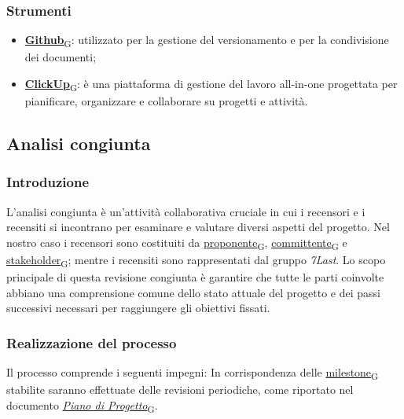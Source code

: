 \subsubsection{Strumenti}

\begin{itemize}
	\item \href{https://7last.github.io/docs/rtb/documentazione-interna/glossario\#github}{\textbf{Github}\textsubscript{G}}: utilizzato per la gestione del versionamento e per la condivisione dei documenti;
	\item \href{https://7last.github.io/docs/rtb/documentazione-interna/glossario\#clickup}{\textbf{ClickUp}\textsubscript{G}}: è una piattaforma di gestione del lavoro all-in-one progettata per pianificare, organizzare e collaborare su progetti e attività.
\end{itemize}


\subsection{Analisi congiunta}
\subsubsection{Introduzione}
L'analisi congiunta è un'attività collaborativa cruciale in cui i recensori e i recensiti si incontrano per esaminare e valutare diversi aspetti del progetto.  Nel nostro caso i recensori sono costituiti da \href{https://7last.github.io/docs/rtb/documentazione-interna/glossario\#proponente}{proponente\textsubscript{G}}, \href{https://7last.github.io/docs/rtb/documentazione-interna/glossario\#committente}{committente\textsubscript{G}} e \href{https://7last.github.io/docs/rtb/documentazione-interna/glossario\#stakeholder}{stakeholder\textsubscript{G}}; mentre i recensiti sono rappresentati dal gruppo \textit{7Last}. Lo scopo principale di questa revisione congiunta è garantire che tutte le parti coinvolte abbiano una comprensione comune dello stato attuale del progetto e dei passi successivi necessari per raggiungere gli obiettivi fissati.

\subsubsection{Realizzazione del processo}
Il processo comprende i seguenti impegni:
In corrispondenza delle \href{https://7last.github.io/docs/rtb/documentazione-interna/glossario\#milestone}{milestone\textsubscript{G}} stabilite saranno effettuate delle revisioni periodiche, come riportato nel
documento \href{https://7last.github.io/docs/rtb/documentazione-interna/glossario\#piano-di-progetto}{\textit{Piano di Progetto}\textsubscript{G}}.

